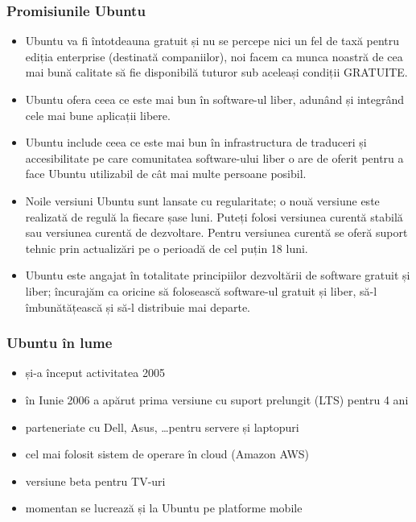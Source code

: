 \documentclass[compress]{beamer}
\begin{document}
\begin{frame}
\frametitle{Promisiunile Ubuntu}

\begin{itemize}[<+->]
  \item Ubuntu va fi întotdeauna gratuit și nu se percepe nici un fel de taxă pentru ediția enterprise (destinată companiilor), noi facem ca munca noastră de cea mai bună calitate să fie disponibilă tuturor sub aceleași condiții GRATUITE.
  \item Ubuntu ofera ceea ce este mai bun în software-ul liber, adunând și integrând
  cele mai bune aplicații libere.
  \item Ubuntu include ceea ce este mai bun în infrastructura de traduceri și accesibilitate pe care comunitatea software-ului liber o are de oferit pentru a face Ubuntu utilizabil de cât mai multe persoane posibil.
  \item Noile versiuni Ubuntu sunt lansate cu regularitate; o nouă versiune este realizată de regulă la fiecare șase luni. Puteți folosi versiunea curentă stabilă sau versiunea curentă de dezvoltare. Pentru versiunea curentă se oferă suport tehnic prin actualizări pe o perioadă de cel puțin 18 luni.
  \item Ubuntu este angajat în totalitate principiilor dezvoltării de software gratuit și liber; încurajăm ca oricine să folosească software-ul gratuit și liber, să-l îmbunătățească și să-l distribuie mai departe.
\end{itemize}
\end{frame}

\begin{frame}
\frametitle{Ubuntu în lume}

\begin{itemize}[<+->]
  \item și-a început activitatea 2005
  \item în Iunie 2006 a apărut prima versiune cu suport prelungit (LTS) pentru 4 ani
  \item parteneriate cu Dell, Asus, \ldots pentru servere și laptopuri
  \item cel mai folosit sistem de operare în cloud (Amazon AWS)
  \item versiune beta pentru TV-uri
  \item momentan se lucrează și la Ubuntu pe platforme mobile
\end{itemize}

\end{frame}
\end{document}
